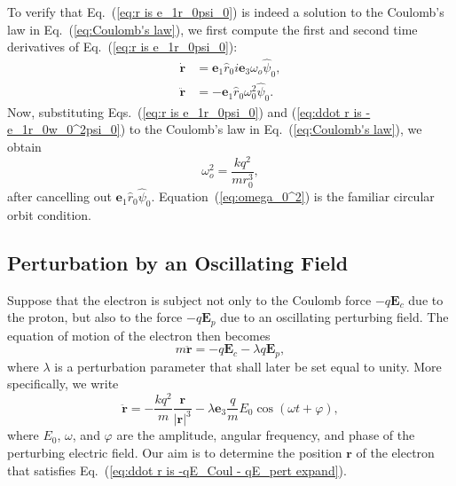 \documentclass[twocolumn,showpacs,preprintnumbers,amsmath,amssymb]{revtex4}
\begin{document}
To verify that Eq.~(\ref{eq:r is e_1r_0psi_0}) is indeed a solution to the Coulomb's law in Eq.~(\ref{eq:Coulomb's law}), we first compute the first and second time derivatives of Eq.~(\ref{eq:r is e_1r_0psi_0}):
\begin{subequations}
\begin{align}
\label{eq:dot r is e_1r_0iw_0psi_0}
\dot{\mathbf{r}} &=\mathbf e_1 \hat{r}_0 i \mathbf e_3 \omega_{o}\hat{\psi}_0,\\
\label{eq:ddot r is -e_1r_0w_0^2psi_0}
\ddot{\mathbf{r}} &=-\mathbf e_1\hat{r}_0\omega_{0}^{2}\hat{\psi}_0.
\end{align}
\end{subequations}
Now, substituting Eqs.~(\ref{eq:r is e_1r_0psi_0}) and (\ref{eq:ddot r is -e_1r_0w_0^2psi_0}) to the Coulomb's law in Eq.~(\ref{eq:Coulomb's law}), we obtain 
\begin{equation}
\label{eq:omega_0^2}
\omega_{o}^{2}=\frac{kq^2}{mr_0^3},
\end{equation}
after cancelling out $\mathbf e_1\hat r_0\hat\psi_0$.  Equation~(\ref{eq:omega_0^2}) is the familiar circular orbit condition.

\subsection{Perturbation by an Oscillating Field}

Suppose that the electron is subject not only to the Coulomb force $-q\mathbf E_{c}$ due to the proton, but also to the force $-q\mathbf E_{p}$ due to an oscillating perturbing field.  The equation of motion of the electron then becomes
\begin{equation}
\label{eq:ddot r is -qE_Coul - qE_pert}
m\ddot{\mathbf r} = -q\mathbf E_{c} - \lambda q\mathbf E_{p},
\end{equation}
where $\lambda$ is a perturbation parameter that shall later be set equal to unity.  More specifically, we write
\begin{equation}
\label{eq:ddot r is -qE_Coul - qE_pert expand}
\ddot{\mathbf r} = -\frac{kq^2}{m}\frac{\mathbf r}{|\mathbf r|^3} - \lambda\mathbf e_3\frac{q}{m}E_0\cos(\omega t + \varphi),
\end{equation}
where $E_0$, $\omega$, and $\varphi$ are the amplitude, angular frequency, and phase of the perturbing electric field.  Our aim is to determine the position $\mathbf r$ of the electron that satisfies Eq.~(\ref{eq:ddot r is -qE_Coul - qE_pert expand}).
\end{document}
